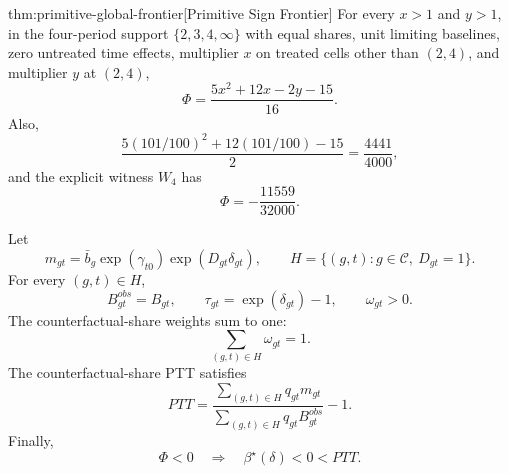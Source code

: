 \begin{theoremv}{thm:primitive-global-frontier}[Primitive Sign Frontier]
For every \(x>1\) and \(y>1\), in the four-period support \(\{2,3,4,\infty\}\) with equal shares, unit limiting baselines, zero untreated time effects, multiplier \(x\) on treated cells other than \((2,4)\), and multiplier \(y\) at \((2,4)\),
\[
\Phi=\frac{5x^2+12x-2y-15}{16}.
\]
Also,
\[
\frac{5(101/100)^2+12(101/100)-15}{2}=\frac{4441}{4000},
\]
and the explicit witness \(W_4\) has
\[
\Phi=-\frac{11559}{32000}.
\]

Let
\[
m_{gt}=\bar b_g\exp(\gamma_{t0})\exp(D_{gt}\delta_{gt}),
\qquad
H=\{(g,t):g\in\mathcal C,\ D_{gt}=1\}.
\]
For every \((g,t)\in H\),
\[
B^{obs}_{gt}=B_{gt},\qquad
\tau_{gt}=\exp(\delta_{gt})-1,\qquad
\omega_{gt}>0.
\]
The counterfactual-share weights sum to one:
\[
\sum_{(g,t)\in H}\omega_{gt}=1.
\]
The counterfactual-share PTT satisfies
\[
PTT
=
\frac{\sum_{(g,t)\in H} q_{gt}m_{gt}}
{\sum_{(g,t)\in H} q_{gt}B^{obs}_{gt}}
-1.
\]
Finally,
\[
\Phi<0
\quad\Longrightarrow\quad
\beta^\star(\delta)<0<PTT .
\]
\end{theoremv}
